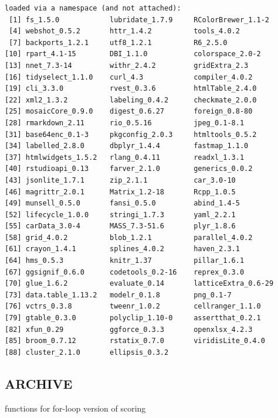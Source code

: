 \documentclass[
  letterpaper,
  DIV=11,
  numbers=noendperiod]{scrreprt}
\begin{document}
\begin{verbatim}
loaded via a namespace (and not attached):
 [1] fs_1.5.0            lubridate_1.7.9     RColorBrewer_1.1-2 
 [4] webshot_0.5.2       httr_1.4.2          tools_4.0.2        
 [7] backports_1.2.1     utf8_1.2.1          R6_2.5.0           
[10] rpart_4.1-15        DBI_1.1.0           colorspace_2.0-2   
[13] nnet_7.3-14         withr_2.4.2         gridExtra_2.3      
[16] tidyselect_1.1.0    curl_4.3            compiler_4.0.2     
[19] cli_3.3.0           rvest_0.3.6         htmlTable_2.4.0    
[22] xml2_1.3.2          labeling_0.4.2      checkmate_2.0.0    
[25] mosaicCore_0.9.0    digest_0.6.27       foreign_0.8-80     
[28] rmarkdown_2.11      rio_0.5.16          jpeg_0.1-8.1       
[31] base64enc_0.1-3     pkgconfig_2.0.3     htmltools_0.5.2    
[34] labelled_2.8.0      dbplyr_1.4.4        fastmap_1.1.0      
[37] htmlwidgets_1.5.2   rlang_0.4.11        readxl_1.3.1       
[40] rstudioapi_0.13     farver_2.1.0        generics_0.0.2     
[43] jsonlite_1.7.1      zip_2.1.1           car_3.0-10         
[46] magrittr_2.0.1      Matrix_1.2-18       Rcpp_1.0.5         
[49] munsell_0.5.0       fansi_0.5.0         abind_1.4-5        
[52] lifecycle_1.0.0     stringi_1.7.3       yaml_2.2.1         
[55] carData_3.0-4       MASS_7.3-51.6       plyr_1.8.6         
[58] grid_4.0.2          blob_1.2.1          parallel_4.0.2     
[61] crayon_1.4.1        splines_4.0.2       haven_2.3.1        
[64] hms_0.5.3           knitr_1.37          pillar_1.6.1       
[67] ggsignif_0.6.0      codetools_0.2-16    reprex_0.3.0       
[70] glue_1.6.2          evaluate_0.14       latticeExtra_0.6-29
[73] data.table_1.13.2   modelr_0.1.8        png_0.1-7          
[76] vctrs_0.3.8         tweenr_1.0.2        cellranger_1.1.0   
[79] gtable_0.3.0        polyclip_1.10-0     assertthat_0.2.1   
[82] xfun_0.29           ggforce_0.3.3       openxlsx_4.2.3     
[85] broom_0.7.12        rstatix_0.7.0       viridisLite_0.4.0  
[88] cluster_2.1.0       ellipsis_0.3.2     
\end{verbatim}

\hypertarget{archive}{%
\subsection{ARCHIVE}\label{archive}}

functions for for-loop version of scoring
\end{document}
